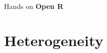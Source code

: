 \documentclass{beamer} %
\begin{document}
		\begin{frame}{Hands on}
  \centering
  \vfill
  {\bfseries\LARGE Open R}
  \vfill
\end{frame}



\section{Heterogeneity}

\end{document}
